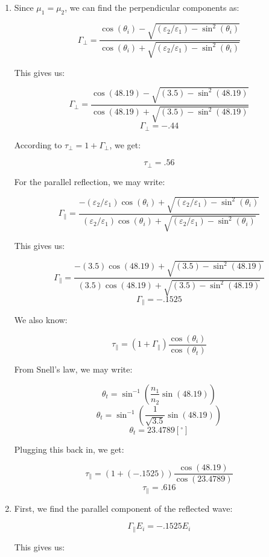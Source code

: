 \begin{enumerate}
\begin{enumerate}
      \item 

        Since $\mu_1=\mu_2$, we can find the perpendicular components as:

        $$\Gamma_{\perp}=\frac{\cos(\theta_i)-\sqrt{(\varepsilon_2/\varepsilon_1)-\sin^2(\theta_i)}}{\cos(\theta_i)+\sqrt{(\varepsilon_2/\varepsilon_1)-\sin^2(\theta_i)}}$$

        This gives us:

        $$\Gamma_{\perp}=\frac{\cos(48.19)-\sqrt{(3.5)-\sin^2(48.19)}}{\cos(48.19)+\sqrt{(3.5)-\sin^2(48.19)}}$$
        $$\boxed{\Gamma_{\perp}=-.44}$$

        According to $\tau_{\perp}=1+\Gamma_{\perp}$, we get:

        $$\boxed{\tau_{\perp}=.56}$$

        For the parallel reflection, we may write:

        $$\Gamma_{\parallel}=\frac{-(\varepsilon_2/\varepsilon_1)\cos(\theta_i)+\sqrt{(\varepsilon_2/\varepsilon_1)-\sin^2(\theta_i)}}{(\varepsilon_2/\varepsilon_1)\cos(\theta_i)+\sqrt{(\varepsilon_2/\varepsilon_1)-\sin^2(\theta_i)}}$$

        This gives us:

        $$\Gamma_{\parallel}=\frac{-(3.5)\cos(48.19)+\sqrt{(3.5)-\sin^2(48.19)}}{(3.5)\cos(48.19)+\sqrt{(3.5)-\sin^2(48.19)}}$$
        $$\boxed{\Gamma_{\parallel}=-.1525}$$

        We also know:

        $$\tau_{\parallel}=(1+\Gamma_{\parallel})\frac{\cos(\theta_i)}{\cos(\theta_t)}$$

        From Snell's law, we may write:

        $$\theta_t=\sin^{-1}\left( \frac{n_1}{n_2}\sin(48.19) \right)$$
        $$\theta_t=\sin^{-1}\left( \frac{1}{\sqrt{3.5}}\sin(48.19) \right)$$
        $$\theta_t=23.4789\left[ ^{\circ} \right]$$

        Plugging this back in, we get:

        $$\tau_{\parallel}=(1+(-.1525))\frac{\cos(48.19)}{\cos(23.4789)}$$
        $$\boxed{\tau_{\parallel}=.616}$$

      \item 

        First, we find the parallel component of the reflected wave:

        $$\Gamma_{\parallel}E_i=-.1525E_i$$

        This gives us:


\end{enumerate}
\end{enumerate}

